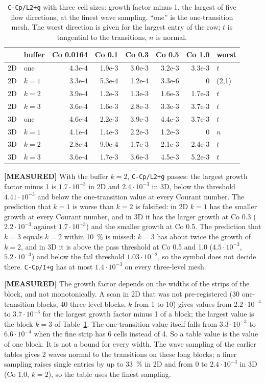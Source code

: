 \documentclass[11pt,a4paper]{article}
\newcommand{\measured}{\textcolor{green!35!black}{\textbf{[MEASURED]}}}
\begin{document}
\begin{table}[h]
\centering
\caption{\texttt{C-Cp/L2+g} with three cell sizes: growth factor minus 1, the largest of
five flow directions, at the finest wave sampling. ``one'' is the one-transition mesh.
The worst direction is given for the largest entry of the row; $t$ is tangential to the
transitions, $n$ is normal.}
\label{tab:threelevels}
\begin{tabular}{llrrrrrl}
\toprule
 & buffer & Co 0.0164 & Co 0.1 & Co 0.3 & Co 0.5 & Co 1.0 & worst \\
\midrule
2D & one    & 4.3e-4 & 1.9e-3 & 3.0e-3 & 3.2e-3 & 3.3e-3 & $t$ \\
2D & $k=1$  & 3.3e-4 & 5.3e-4 & 1.2e-4 & 3.3e-6 & 0      & (2,1) \\
2D & $k=2$  & 3.9e-4 & 1.2e-3 & 1.3e-3 & 1.6e-3 & 1.7e-3 & $t$ \\
2D & $k=3$  & 3.6e-4 & 1.6e-3 & 2.8e-3 & 3.3e-3 & 3.7e-3 & $t$ \\
\midrule
3D & one    & 4.6e-4 & 2.2e-3 & 3.9e-3 & 4.4e-3 & 3.7e-3 & $t$ \\
3D & $k=1$  & 4.1e-4 & 1.4e-3 & 2.2e-3 & 1.2e-3 & 0      & $n$ \\
3D & $k=2$  & 2.8e-4 & 9.0e-4 & 1.7e-3 & 2.1e-3 & 2.4e-3 & $t$ \\
3D & $k=3$  & 3.6e-4 & 1.7e-3 & 3.6e-3 & 4.5e-3 & 5.2e-3 & $t$ \\
\bottomrule
\end{tabular}
\end{table}

\measured{} With the buffer $k=2$, \texttt{C-Cp/L2+g} passes: the largest growth factor
minus 1 is $1.7\cdot10^{-3}$ in 2D and $2.4\cdot10^{-3}$ in 3D, below the threshold
$4.41\cdot10^{-3}$ and below the one-transition value at every Courant number. The
prediction that $k=1$ is worse than $k=2$ is falsified: in 2D $k=1$ has the smaller growth
at every Courant number, and in 3D it has the larger growth at Co 0.3 ($2.2\cdot10^{-3}$
against $1.7\cdot10^{-3}$) and the smaller growth at Co 0.5. The prediction that $k=3$
equals $k=2$ within 10~\% is missed: $k=3$ has about twice the growth of $k=2$, and in 3D
it is above the pass threshold at Co 0.5 and 1.0 ($4.5\cdot10^{-3}$, $5.2\cdot10^{-3}$) and
below the fail threshold $1.03\cdot10^{-2}$, so the symbol does not decide there.
\texttt{C-Cp/I+g} has at most $1.4\cdot10^{-3}$ on every three-level mesh.

\measured{} The growth factor depends on the widths of the strips of the block, and not
monotonically. A scan in 2D that was not pre-registered (30 one-transition blocks, 40
three-level blocks, $k$ from 1 to 10) gives values from $2.2\cdot10^{-4}$ to
$3.7\cdot10^{-3}$ for the largest growth factor minus 1 of a block; the largest value is the block $k=3$ of Table~\ref{tab:threelevels}.
The one-transition value itself falls from $3.3\cdot10^{-3}$ to $6.6\cdot10^{-4}$ when the
fine strip has 6 cells instead of 4. So a table value is the value of one block. It is
not a bound for every width. The wave sampling of the earlier tables gives 2 waves normal
to the transitions on these long blocks; a finer sampling raises single entries by up to
33~\% in 2D and from 0 to $2.4\cdot10^{-3}$ in 3D (Co 1.0, $k=2$), so the table uses the
finest sampling.
\end{document}
